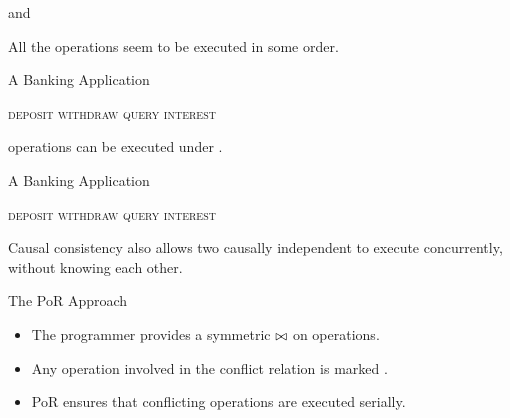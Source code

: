 \begin{frame}{\ser{} and \cc}
  \begin{center}
    All the operations seem to be executed in some  order.
  \end{center}
\end{frame}

\begin{frame}{A Banking Application}
  \begin{center}
    \textsc{deposit \quad withdraw \quad query \quad interest}

    \pause
    \vspace{0.50cm}
     operations can be executed under \blue{\cc}.

    \pause
    \vspace{0.50cm}
    {}
  \end{center}
\end{frame}

\begin{frame}{A Banking Application}
  \begin{center}
    \textsc{deposit \quad withdraw \quad query \quad interest}

    \pause
    \vspace{0.50cm}
    {Causal consistency also allows two causally independent  to execute concurrently,
    without knowing each other.}

    \pause
    \vspace{0.50cm}
    {}
  \end{center}
\end{frame}

\begin{frame}{The PoR Approach}

  \begin{itemize}
    \setlength{\itemsep}{8pt}
    \item The programmer provides a symmetric 
      $\bowtie$ on operations.
    \item Any operation involved in the conflict relation is marked .
    \item PoR ensures that conflicting operations are executed serially.
  \end{itemize}
\end{frame}


